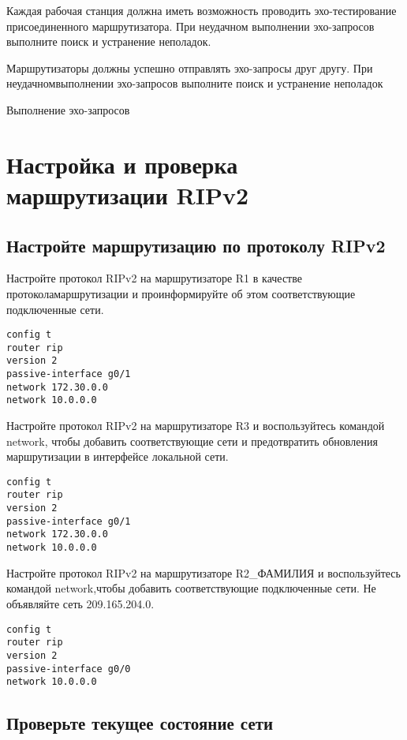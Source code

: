 Каждая рабочая станция должна иметь возможность проводить
эхо-тестирование присоединенного маршрутизатора.
При неудачном выполнении эхо-запросов выполните поиск и устранение неполадок.

Маршрутизаторы должны успешно отправлять эхо-запросы друг другу.
При неудачномвыполнении эхо-запросов выполните поиск и устранение неполадок

\begin{image}
	\caption{Выполнение эхо-запросов}
\end{image}

\section{Настройка и проверка маршрутизации RIPv2}

\subsection{Настройте маршрутизацию по протоколу RIPv2}
Настройте протокол RIPv2 на маршрутизаторе R1
в качестве протоколамаршрутизации и проинформируйте
об этом соответствующие подключенные сети.

\begin{verbatim}
config t
router rip
version 2
passive-interface g0/1
network 172.30.0.0
network 10.0.0.0
\end{verbatim}

Настройте протокол RIPv2 на маршрутизаторе R3 и воспользуйтесь
командой network, чтобы добавить соответствующие сети
и предотвратить обновления маршрутизации в интерфейсе локальной сети.

\begin{verbatim}
config t
router rip
version 2
passive-interface g0/1
network 172.30.0.0
network 10.0.0.0
\end{verbatim}

Настройте протокол RIPv2 на маршрутизаторе R2\_ФАМИЛИЯ и воспользуйтесь
командой network,чтобы добавить соответствующие подключенные сети.
Не объявляйте сеть 209.165.204.0.

\begin{verbatim}
config t
router rip
version 2
passive-interface g0/0
network 10.0.0.0
\end{verbatim}

\subsection{Проверьте текущее состояние сети}

